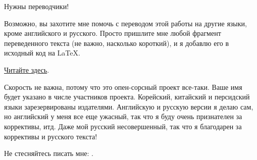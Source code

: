 \vspace*{\fill}

\Huge Нужны переводчики!
\normalsize

\bigskip
\bigskip
\bigskip

Возможно, вы захотите мне помочь с переводом этой работы на другие языки, кроме английского и русского.
Просто пришлите мне любой фрагмент переведенного текста (не важно, насколько короткий), и я добавлю его в исходный код на LaTeX.

\href{https://github.com/dennis714/RE-for-beginners/blob/master/Translation.md}{Читайте здесь}.

Скорость не важна, потому что это опен-сорсный проект все-таки.
Ваше имя будет указано в числе участников проекта.
Корейский, китайский и персидский языки зарезервированы издателями.
Английскую и русскую версии я делаю сам, но английский у меня все еще ужасный, так что я буду очень признателен за коррективы, итд.
Даже мой русский несовершенный, так что я благодарен за коррективы и русского текста!

Не стесняйтесь писать мне: \GTT{\EMAIL}.

\vspace*{\fill}
\vfill
